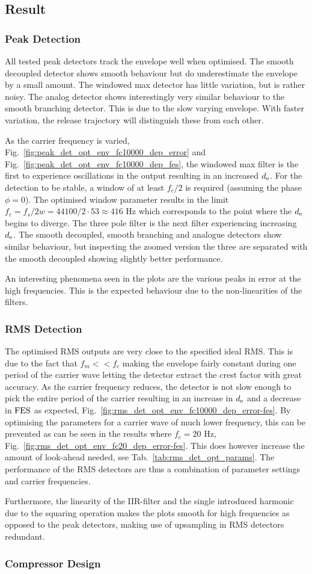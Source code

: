 \documentclass[../main2.tex]{subfiles}
\begin{document}
\subsection{Result}\label{discussion_results}
\subsubsection{Peak Detection}
All tested peak detectors track the envelope well when optimised. The smooth decoupled detector shows smooth behaviour but do underestimate the envelope by a small amount. The windowed max detector has little variation, but is rather noisy. The analog detector shows interestingly very similar behaviour to the smooth branching detector. This is due to the slow varying envelope. With faster variation, the release trajectory will distinguish these from each other.

As the carrier frequency is varied, Fig.~\ref{fig:peak_det_opt_env_fc10000_dep_error} and Fig.~\ref{fig:peak_det_opt_env_fc10000_dep_fes}, the windowed max filter is the first to experience oscillations in the output resulting in an increased $d_\text{e}$. For the detection to be stable, a window of at least $f_c/2$ is required (assuming the phase $\phi=0$). The optimised window parameter results in the limit $f_c =  f_s/2w = 44100/2\cdot 53 \approx 416$ Hz which corresponds to the point where the $d_\text{e}$ begins to diverge. The three pole filter is the next filter experiencing increasing $d_\text{e}$. The smooth decoupled, smooth branching and analogue detectors show similar behaviour, but inspecting the zoomed version the three are separated with the smooth decoupled showing slightly better performance.

An interesting phenomena seen in the plots are the various peaks in error at the high frequencies. This is the expected behaviour due to the non-linearities of the filters. 

\subsubsection{RMS Detection}
The optimised RMS outputs are very close to the specified ideal RMS. This is due to the fact that $f_m<<f_c$ making the envelope fairly constant during one period of the carrier wave letting the detector extract the crest factor with great accuracy. As the carrier frequency reduces, the detector is not slow enough to pick the entire period of the carrier resulting in an increase in $d_\text{e}$ and a decrease in $\text{FES}$ as expected, Fig.~\ref{fig:rms_det_opt_env_fc10000_dep_error-fes}. By optimising the parameters for a carrier wave of much lower frequency, this can be prevented as can be seen in the results where $f_c=20$ Hz, Fig.~\ref{fig:rms_det_opt_env_fc20_dep_error-fes}. This does however increase the amount of look-ahead needed, see Tab.~\ref{tab:rms_det_opt_params}. The performance of the RMS detectors are thus a combination of parameter settings and carrier frequencies.

Furthermore, the linearity of the IIR-filter and the single introduced harmonic due to the squaring operation makes the plots smooth for high frequencies as opposed to the peak detectors, making use of upsampling in RMS detectors redundant.

\subsubsection{Compressor Design}
\end{document}

